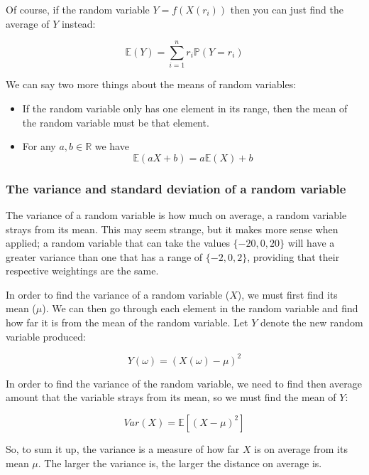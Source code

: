 Of course, if the random variable $Y = f(X(r_i))$ then you can just find
the average of $Y$ instead:

\begin{dmath*}
	\mathbb{E}(Y) = {\sum\limits_{i=1}^{n} r_i \mathbb{P}(Y = r_i)}
\end{dmath*}

We can say two more things about the means of random variables:

\begin{itemize}
	\item If the random variable only has one element in its range, then the mean of the random variable must be that element.
	\item For any $a, b \in \mathbb{R}$ we have
	\begin{dmath*}
		\mathbb{E}(aX + b) = a\mathbb{E}(X) + b
	\end{dmath*}
\end{itemize}

\subsubsection{The variance and standard deviation of a random variable}

The variance of a random variable is how much on average, a random variable
strays from its mean. This may seem strange, but it makes more sense when
applied; a random variable that can take the values $\{-20, 0, 20\}$ will have
a greater variance than one that has a range of $\{-2, 0, 2\}$, providing that
their respective weightings are the same.

In order to find the variance of a random variable ($X$), we must first find
its mean ($\mu$). We can then go through each element in the random variable
and find how far it is from the mean of the random variable. Let $Y$ denote
the new random variable produced:

\begin{dmath*}
	Y(\omega) = (X(\omega) - \mu)^2
\end{dmath*}

In order to find the variance of the random variable, we need to find then
average amount that the variable strays from its mean, so we must find the
mean of $Y$:

\begin{dmath*}
	Var(X) = \mathbb{E}[(X - \mu)^2]
\end{dmath*}

So, to sum it up, the variance is a measure of how far $X$ is on average from
its mean $\mu$. The larger the variance is, the larger the distance on
average is.

